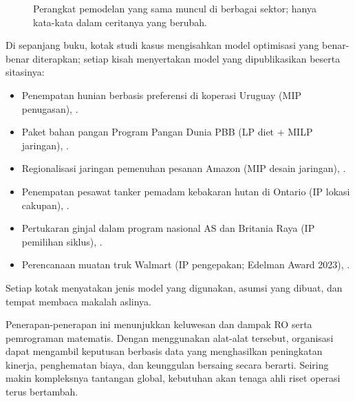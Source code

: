 \begin{figure}[h]
\centering
{}
\caption{Perangkat pemodelan yang sama muncul di berbagai sektor; hanya kata-kata dalam ceritanya yang berubah.}
\label{fig:or-sectors}
\end{figure}

\begin{tcolorbox}[colback=blue!4!white, colframe=blue!55!black,
  title=\textbf{Studi kasus dalam buku ini}]
Di sepanjang buku, kotak studi kasus mengisahkan model optimisasi yang benar-benar
diterapkan; setiap kisah menyertakan model yang dipublikasikan beserta sitasinya:
\begin{itemize}
\item Penempatan hunian berbasis preferensi di koperasi Uruguay (MIP penugasan), .
\item Paket bahan pangan Program Pangan Dunia PBB (LP diet + MILP jaringan), .
\item Regionalisasi jaringan pemenuhan pesanan Amazon (MIP desain jaringan), .
\item Penempatan pesawat tanker pemadam kebakaran hutan di Ontario (IP lokasi cakupan), .
\item Pertukaran ginjal dalam program nasional AS dan Britania Raya (IP pemilihan siklus), .
\item Perencanaan muatan truk Walmart (IP pengepakan; Edelman Award 2023), .
\end{itemize}
Setiap kotak menyatakan jenis model yang digunakan, asumsi yang dibuat, dan tempat
membaca makalah aslinya.
\end{tcolorbox}

Penerapan-penerapan ini menunjukkan keluwesan dan dampak RO serta pemrograman matematis. Dengan menggunakan alat-alat tersebut, organisasi dapat mengambil keputusan berbasis data yang menghasilkan peningkatan kinerja, penghematan biaya, dan keunggulan bersaing secara berarti. Seiring makin kompleksnya tantangan global, kebutuhan akan tenaga ahli riset operasi terus bertambah.

